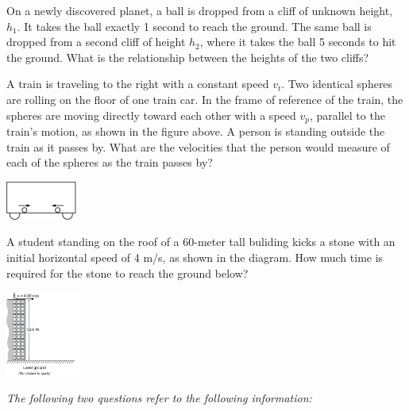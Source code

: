 \documentclass[10pt]{examdesign}
\begin{document}
\begin{multiplechoice} [title={Multiple Choice},
	rearrange=yes]
\begin{question}
	On a newly discovered planet, a ball is dropped from a cliff of unknown height, $h_1$.  It takes the ball exactly 1 second to reach the ground.  The same ball is dropped from a second cliff of height $h_2$, where it takes the ball 5 seconds to hit the ground.  What is the relationship between the heights of the two cliffs?  

\end{question}

\begin{question}
	A train is traveling to the right with a constant speed $v_t$.  Two identical spheres are rolling on the floor of one train car.  In the frame of reference of the train, the spheres are moving directly toward each other with a speed $v_p$, parallel to the train's motion, as shown in the figure above.  A person is standing outside the train as it passes by.  What are the velocities that the person would measure of each of the spheres as the train passes by? 
	
	\begin{center}
		\includegraphics[height=0.5in]{train2.png}  
	\end{center}
	
	

	
\end{question}

\begin{question}
	A student standing on the roof of a 60-meter tall buliding kicks a stone with an initial horizontal speed of 4 m/s, as shown in the diagram.  How much time is required for the stone to reach the ground below? 

 \hspace{2 in} \includegraphics[height=1.1in]{building.png}
	
\end{question}


\begin{block}
	\textit{	The following two questions refer to the following information:}
	

\end{block}
\end{multiplechoice}
\end{document}
